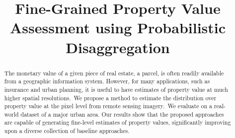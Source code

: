 \documentclass[10pt,twocolumn,a4paper]{article}
\begin{document}
\title{Fine-Grained Property Value Assessment using Probabilistic Disaggregation}

                \address{$^1$University of Kentucky
                \hspace{1cm}
                $^2$BlueHalo
                \hspace{1cm}
                $^3$Washington University in St. Louis}

\maketitle
\thispagestyle{empty}



\begin{abstract}

The monetary value of a given piece of real estate, a parcel, is often readily available from a geographic information system. However, for many applications, such as insurance and urban planning, it is useful to have estimates of property value at much higher spatial resolutions.~We propose a method to estimate the distribution over property value at the pixel level from remote sensing imagery.~We evaluate on a real-world dataset of a major urban area. Our results show that the proposed approaches are capable of generating %
fine-level estimates of property values, significantly improving upon a diverse collection of baseline approaches.


\end{abstract}
\end{document}
